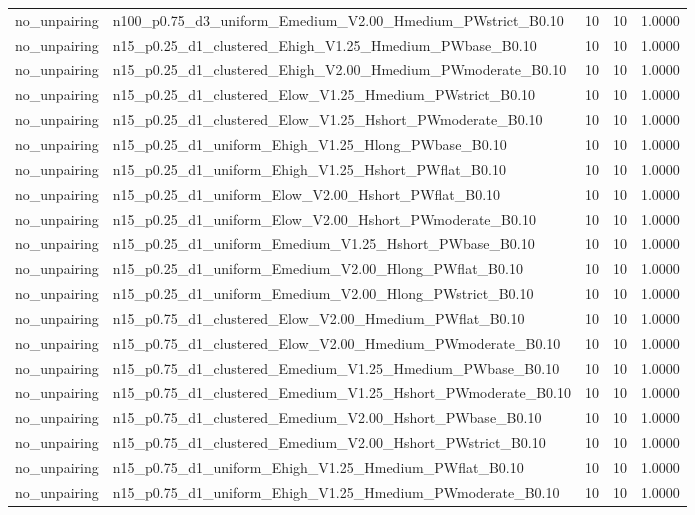 \begin{tabular}{llrrr}
no_unpairing & n100_p0.75_d3_uniform_Emedium_V2.00_Hmedium_PWstrict_B0.10 & 10 & 10 & 1.0000 \\
no_unpairing & n15_p0.25_d1_clustered_Ehigh_V1.25_Hmedium_PWbase_B0.10 & 10 & 10 & 1.0000 \\
no_unpairing & n15_p0.25_d1_clustered_Ehigh_V2.00_Hmedium_PWmoderate_B0.10 & 10 & 10 & 1.0000 \\
no_unpairing & n15_p0.25_d1_clustered_Elow_V1.25_Hmedium_PWstrict_B0.10 & 10 & 10 & 1.0000 \\
no_unpairing & n15_p0.25_d1_clustered_Elow_V1.25_Hshort_PWmoderate_B0.10 & 10 & 10 & 1.0000 \\
no_unpairing & n15_p0.25_d1_uniform_Ehigh_V1.25_Hlong_PWbase_B0.10 & 10 & 10 & 1.0000 \\
no_unpairing & n15_p0.25_d1_uniform_Ehigh_V1.25_Hshort_PWflat_B0.10 & 10 & 10 & 1.0000 \\
no_unpairing & n15_p0.25_d1_uniform_Elow_V2.00_Hshort_PWflat_B0.10 & 10 & 10 & 1.0000 \\
no_unpairing & n15_p0.25_d1_uniform_Elow_V2.00_Hshort_PWmoderate_B0.10 & 10 & 10 & 1.0000 \\
no_unpairing & n15_p0.25_d1_uniform_Emedium_V1.25_Hshort_PWbase_B0.10 & 10 & 10 & 1.0000 \\
no_unpairing & n15_p0.25_d1_uniform_Emedium_V2.00_Hlong_PWflat_B0.10 & 10 & 10 & 1.0000 \\
no_unpairing & n15_p0.25_d1_uniform_Emedium_V2.00_Hlong_PWstrict_B0.10 & 10 & 10 & 1.0000 \\
no_unpairing & n15_p0.75_d1_clustered_Elow_V2.00_Hmedium_PWflat_B0.10 & 10 & 10 & 1.0000 \\
no_unpairing & n15_p0.75_d1_clustered_Elow_V2.00_Hmedium_PWmoderate_B0.10 & 10 & 10 & 1.0000 \\
no_unpairing & n15_p0.75_d1_clustered_Emedium_V1.25_Hmedium_PWbase_B0.10 & 10 & 10 & 1.0000 \\
no_unpairing & n15_p0.75_d1_clustered_Emedium_V1.25_Hshort_PWmoderate_B0.10 & 10 & 10 & 1.0000 \\
no_unpairing & n15_p0.75_d1_clustered_Emedium_V2.00_Hshort_PWbase_B0.10 & 10 & 10 & 1.0000 \\
no_unpairing & n15_p0.75_d1_clustered_Emedium_V2.00_Hshort_PWstrict_B0.10 & 10 & 10 & 1.0000 \\
no_unpairing & n15_p0.75_d1_uniform_Ehigh_V1.25_Hmedium_PWflat_B0.10 & 10 & 10 & 1.0000 \\
no_unpairing & n15_p0.75_d1_uniform_Ehigh_V1.25_Hmedium_PWmoderate_B0.10 & 10 & 10 & 1.0000 \\

\end{tabular}

